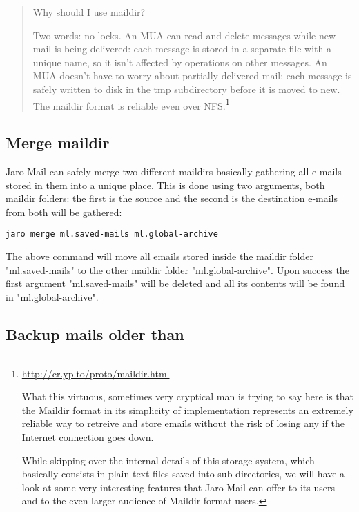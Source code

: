 \documentclass[a4,onecolumn,portrait]{article}
\begin{document}
\begin{quote}


Why should I use maildir?

Two words: no locks. An MUA can read and delete messages while new
mail is being delivered: each message is stored in a separate file
with a unique name, so it isn't affected by operations on other
messages. An MUA doesn't have to worry about partially delivered mail:
each message is safely written to disk in the tmp subdirectory before
it is moved to new. The maildir format is reliable even over NFS.\footnote{\url{http://cr.yp.to/proto/maildir.html}

What this virtuous, sometimes very cryptical man is trying to say here
is that the Maildir format in its simplicity of implementation
represents an extremely reliable way to retreive and store emails
without the risk of losing any if the Internet connection goes down.

While skipping over the internal details of this storage system, which
basically consists in plain text files saved into sub-directories, we
will have a look at some very interesting features that Jaro Mail can
offer to its users and to the even larger audience of Maildir format
users.}
\end{quote}

\subsection{Merge maildir}
\label{sec-10-1}

Jaro Mail can safely merge two different maildirs basically gathering
all e-mails stored in them into a unique place. This is done using two
arguments, both maildir folders: the first is the source and the
second is the destination e-mails from both will be gathered:

\begin{verbatim}
jaro merge ml.saved-mails ml.global-archive
\end{verbatim}

The above command will move all emails stored inside the maildir
folder "ml.saved-mails" to the other maildir folder
"ml.global-archive". Upon success the first argument "ml.saved-mails"
will be deleted and all its contents will be found in
"ml.global-archive".
\subsection{Backup mails older than}
\label{sec-10-2}
\end{document}
